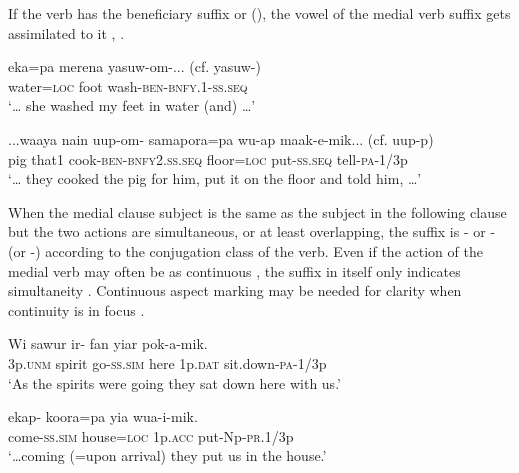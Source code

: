 If the verb has the beneficiary suffix  or  (), the vowel of the medial verb suffix gets assimilated to it , .

\ea%
\label{ex:3:x1930}
\gll {\dots}eka=pa merena yasuw-om-... (cf. yasuw-) \\
water=\textsc{loc} foot wash-\textsc{ben}-\textsc{bnfy}.1-\textsc{ss}.\textsc{seq}\\
\glt`{\dots} she washed my feet in water (and) {\dots}'
\z

\ea%
\label{ex:3:x1929}
\gll ...waaya nain uup-om- samapora=pa wu-ap maak-e-mik... (cf. uup-p)\\
pig that1 cook-\textsc{ben}-\textsc{bnfy}2.\textsc{ss}.\textsc{seq} floor=\textsc{loc} put-\textsc{ss}.\textsc{seq} tell-\textsc{pa}-1/3p\\
\glt`{\dots} they cooked the pig for him, put it on the floor and told him, {\dots}'
\z

When the medial clause subject is the same as the subject in the following clause but the two actions are simultaneous, or at least overlapping, the suffix is \nobreakdash- or \nobreakdash- (or \nobreakdash-) according to the conjugation class of the verb. Even if the action of the medial verb may often be  as continuous , the suffix in itself only indicates simultaneity . Continuous aspect marking may be needed for clarity when continuity is in focus .

\ea%
\label{ex:3:x239}
\gll Wi sawur ir- fan yiar pok-a-mik. \\
3p.\textsc{unm} spirit go-\textsc{ss}.\textsc{sim} here 1p.\textsc{dat} sit.down-\textsc{pa}-1/3p \\
\glt`As the spirits were going they sat down here with us.' 
\z

\ea%
\label{ex:3:x240}
\gll {\dots}ekap- koora=pa yia wua-i-mik. \\
come-\textsc{ss}.\textsc{sim} house=\textsc{loc} 1p.\textsc{acc} put-Np-\textsc{pr}.1/3p \\
\glt`{\dots}coming (=upon arrival) they put us in the house.' 
\z

